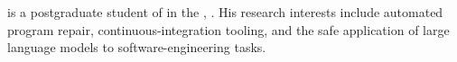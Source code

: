 
\textbf{\ThesisAuthorName} is a postgraduate student of \textbf{\ThesisProgram} in the
\textbf{\ThesisDepartment}, \textbf{\ThesisInstitute}. His research interests include automated program repair,
continuous-integration tooling, and the safe application of large language models to software-engineering tasks.
\clearpage
